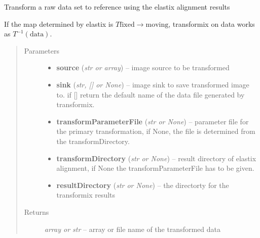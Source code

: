 \documentclass[letterpaper,10pt,english]{sphinxmanual}
\begin{document}
\begin{fulllineitems}
\label{api/ClearMap.Alignment:ClearMap.Alignment.Elastix.transformData}
Transform a raw data set to reference using the elastix alignment results

If the map determined by elastix is
$T \mathrm{fixed} \rightarrow \mathrm{moving}$,
transformix on data works as $T^{-1}(\mathrm{data})$.
\begin{quote}\begin{description}
\item[{Parameters}] \leavevmode\begin{itemize}
\item {} 
\textbf{source} (\emph{str or array}) --
image source to be transformed

\item {} 
\textbf{sink} (\emph{str, {[}{]} or None}) --
image sink to save transformed image to. if {[}{]} return the default name of the data file generated by transformix.

\item {} 
\textbf{transformParameterFile} (\emph{str or None}) --
parameter file for the primary transformation, if None, the file is determined from the transformDirectory.

\item {} 
\textbf{transformDirectory} (\emph{str or None}) --
result directory of elastix alignment, if None the transformParameterFile has to be given.

\item {} 
\textbf{resultDirectory} (\emph{str or None}) --
the directorty for the transformix results

\end{itemize}

\item[{Returns}] \leavevmode
\emph{array or str} --
array or file name of the transformed data

\end{description}\end{quote}

\end{fulllineitems}

\end{document}
